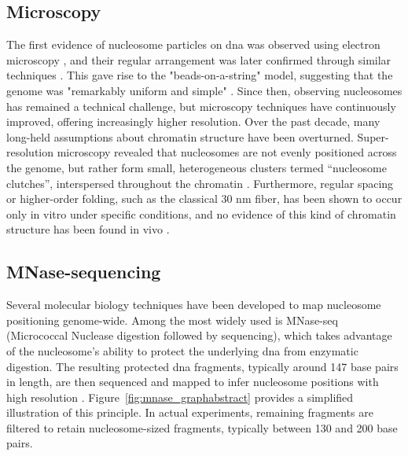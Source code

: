 \documentclass[11pt]{book}
\begin{document}
\subsection{Microscopy}
The first evidence of nucleosome particles on \gls{dna} was observed using electron microscopy \cite{olins_spheroid_1974}, and their regular arrangement was later confirmed through similar techniques \cite{comptonBiochemicalElectronmicroscopicEvidence1976}. This gave rise to the "beads-on-a-string" model, suggesting that the genome was "remarkably uniform and simple" \cite{kornberg_structure_1977}.
Since then, observing nucleosomes has remained a technical challenge, but microscopy techniques have continuously improved, offering increasingly higher resolution.
Over the past decade, many long-held assumptions about chromatin structure have been overturned. Super-resolution microscopy revealed that nucleosomes are not evenly positioned across the genome, but rather form small, heterogeneous clusters termed “nucleosome clutches”, interspersed throughout the chromatin \cite{ricci_chromatin_2015}. Furthermore, regular spacing or higher-order folding, such as the classical 30 nm fiber, has been shown to occur only in vitro under specific conditions, and no evidence of this kind of chromatin structure has been found in vivo \cite{nishino_human_2012, ricci_chromatin_2015, baldi_beads_2020}.

\subsection{MNase-sequencing}
Several molecular biology techniques have been developed to map nucleosome positioning genome-wide. Among the most widely used is MNase-seq (Micrococcal Nuclease digestion followed by sequencing), which takes advantage of the nucleosome’s ability to protect the underlying \gls{dna} from enzymatic digestion. The resulting protected \gls{dna} fragments, typically around 147 base pairs in length, are then sequenced and mapped to infer nucleosome positions with high resolution \cite{yuanGenomescaleIdentificationNucleosome2005, kaplanDNAencodedNucleosomeOrganization2009}. Figure~\ref{fig:mnase_graphabstract} provides a simplified illustration of this principle. In actual experiments, remaining fragments are filtered to retain nucleosome-sized fragments, typically between 130 and 200 base pairs.
\end{document}
